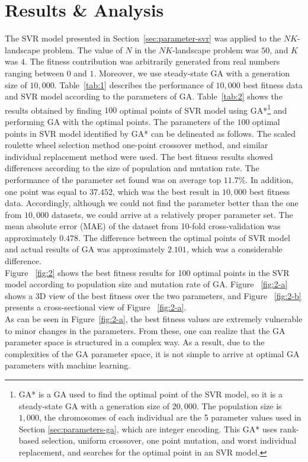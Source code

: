 \section{Results \& Analysis}
  \label{sec:results}
  The SVR model presented in Section~\ref{sec:parameter-svr} was applied to the $NK$-landscape problem. The value of $N$ in the $NK$-landscape problem was $50$, and $K$ was $4$. The fitness contribution was arbitrarily generated from real numbers ranging between $0$ and $1$. Moreover, we use steady-state GA with a generation size of $10,000$. Table~\ref{tab:1} describes the performance of $10,000$ best fitness data and SVR model according to the parameters of GA. Table~\ref{tab:2} shows the results obtained by finding $100$ optimal points of SVR model using GA*\footnote{GA{*} is a GA used to find the optimal point of the SVR model, so it is a steady-state GA with a generation size of $20,000$. The population size is $1,000$, the chromosomes of each individual are the 5 parameter values used in Section \ref{sec:parameters-ga}, which are integer encoding. This GA* uses rank-based selection, uniform crossover, one point mutation, and worst individual replacement, and searches for the optimal point in an SVR model.} and performing GA with the optimal points. The parameters of the $100$ optimal points in SVR model identified by GA{*} can be delineated as follows. The scaled roulette wheel selection method one-point crossover method, and similar individual replacement method were used. The best fitness results showed differences according to the size of population and mutation rate. The performance of the parameter set found was on average top $11.7$\%. In addition, one point was equal to $37.452$, which was the best result in $10,000$ best fitness data. Accordingly, although we could not find the parameter better than the one from $10,000$ datasets, we could arrive at a relatively proper parameter set. The mean absolute error (MAE) of the dataset from 10-fold cross-validation was approximately $0.478$. The difference between the optimal points of SVR model and actual results of GA was approximately $2.101$, which was a considerable difference. \\
  Figure ~\ref{fig:2} shows the best fitness results for 100 optimal points in the SVR model according to population size and mutation rate of GA. Figure ~\ref{fig:2-a} shows a 3D view of the best fitness over the two parameters, and Figure ~\ref{fig:2-b} presents a cross-sectional view of Figure ~\ref{fig:2-a}. \\
  As can be seen in Figure~\ref{fig:2-a}, the best fitness values are extremely vulnerable to minor changes in the parameters. From these, one can realize that the GA parameter space is structured in a complex way. As a result, due to the complexities of the GA parameter space, it is not simple to arrive at optimal GA parameters with machine learning.

